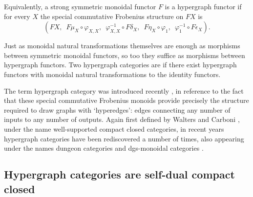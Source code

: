 Equivalently, a strong symmetric monoidal functor $F$ is a hypergraph functor if
for every $X$ the special commutative Frobenius structure on $FX$ is
\[
  (FX,\enspace F\mu_X \circ \varphi_{X,X},\enspace  \varphi^{-1}_{X,X} \circ F\delta_X,\enspace  F\eta_X \circ
  \varphi_1,\enspace  \varphi_1^{-1} \circ F\epsilon_X).
\]

Just as monoidal natural transformations themselves are enough as morphisms
between symmetric monoidal functors, so too they suffice as morphisms between
hypergraph functors. Two hypergraph categories are  if there exist hypergraph functors with monoidal natural
transformations to the identity functors. 
  
The term hypergraph category was introduced recently \cite{Fon15,Kis16}, in
reference to the fact that these special commutative Frobenius monoids provide
precisely the structure required to draw graphs with `hyperedges': edges
connecting any number of inputs to any number of outputs. Again first defined by
Walters and Carboni \cite{Car91}, under the name well-supported compact closed
categories, in recent years hypergraph categories have been rediscovered a
number of times, also appearing under the names dungeon categories \cite{Mor12}
and dgs-monoidal categories \cite{Gad}. 




\subsection{Hypergraph categories are self-dual compact closed}

